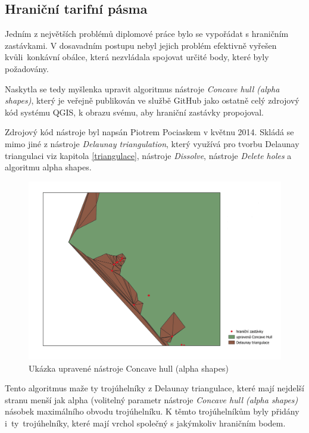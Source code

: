 \subsection{Hraniční tarifní pásma}
\label{hranice}

Jedním z největších problémů diplomové práce bylo se vypořádat s hraničním zastávkami.
V dosavadním postupu nebyl jejich problém efektivně vyřešen kvůli~kon\-kávní obálce,
která nezvládala spojovat určité body, které byly požadovány.

Naskytla se tedy myšlenka upravit algoritmus nástroje \textit{Concave hull (alpha sha\-pes)},
který je veřejně publikován ve službě GitHub jako ostatně celý zdrojový kód systému QGIS, k obrazu
svému, aby hraniční zastávky propojoval. 

Zdrojový kód nástroje byl napsán Piotrem Pociaskem v květnu 2014. Skládá se mimo jiné z nástroje
\textit{Delaunay triangulation}, který využívá pro tvorbu Delaunay triangulaci viz kapitola \ref{triangulace},
nástroje \textit{Dissolve}, nástroje \textit{Delete holes} a algoritmu alpha shapes.

\begin{figure}[H] \centering
    \includegraphics[width=400pt]{./pictures/concave_hull_upravena.png}
    \caption[Ukázka upravené nástroje Concave hull (alpha shapes)]{Ukázka upravené nástroje Concave hull (alpha shapes)}
	\label{fig:concave_hull_upravena}              
\end{figure}

Tento algoritmus maže ty trojúhelníky z Delaunay triangulace, které mají nejdelší stranu menší jak alpha (volitelný
parametr nástroje \textit{Concave hull (alpha sha\-pes)} násobek maximálního obvodu trojúhelníku.
K těmto trojúhelníkům byly přidá\-ny i~ty~trojúhelníky, které mají vrchol společný s jakýmkoliv hraničním bodem.


